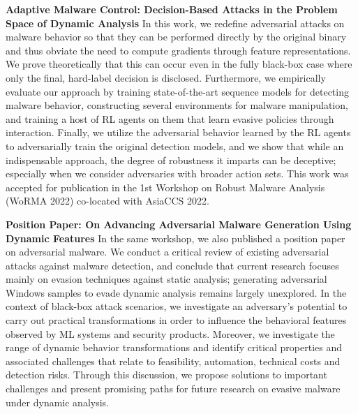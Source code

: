 \begin{myleftbar}
\end{myleftbar}

\textbf{Adaptive Malware Control: Decision-Based Attacks in the Problem Space of Dynamic Analysis}
In this work, we redefine adversarial attacks on malware behavior so that they can be performed directly by the original binary and thus obviate the need to compute gradients through feature representations.
We prove theoretically that this can occur even in the fully black-box case where only the final, hard-label decision is disclosed.
Furthermore, we empirically evaluate our approach by training state-of-the-art sequence models for detecting malware behavior, constructing several environments for malware manipulation, and training a host of \gls{RL} agents on them that learn evasive policies through interaction.
Finally, we utilize the adversarial behavior learned by the RL agents to adversarially train the original detection models, and we show that while an indispensable approach, the degree of robustness it imparts can be deceptive; especially when we consider adversaries with broader action sets.
This work was accepted for publication in the 1st Workshop on Robust Malware Analysis (WoRMA 2022) co-located with AsiaCCS 2022.

\begin{myleftbar}
\end{myleftbar}

\textbf{Position Paper: On Advancing Adversarial Malware Generation Using Dynamic Features}
In the same workshop, we also published a position paper on adversarial malware.
We conduct a critical review of existing adversarial attacks against malware detection, and conclude that current research focuses mainly on evasion techniques against static analysis; generating adversarial Windows samples to evade dynamic analysis remains largely unexplored.
In the context of black-box attack scenarios, we investigate an adversary's potential to carry out practical transformations in order to influence the behavioral features observed by ML systems and security products.
Moreover, we investigate the range of dynamic behavior transformations and identify critical properties and associated challenges that relate to feasibility, automation, technical costs and detection risks.
Through this discussion, we propose solutions to important challenges and present promising paths for future research on evasive malware under dynamic analysis.

